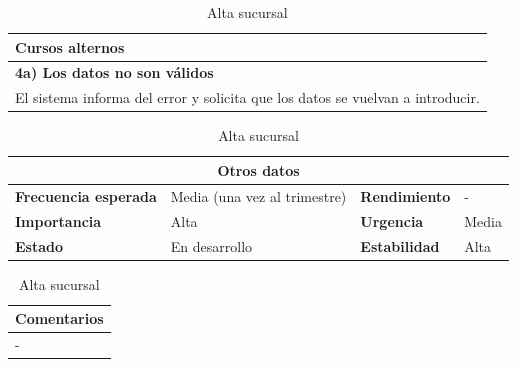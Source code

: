 \documentclass[12pt,spanish]{article}
\begin{document}
\begin{table}[H]
\vspace{1cm}

\begin{tabular}{|m{10pt}|m{7.15cm}|m{10pt}|m{7.15cm}|}
\hline
\multicolumn{4}{|m{16.2cm}|}{\textbf{Cursos alternos}} \\
\hline
\multicolumn{4}{|m{16.2cm}|}{\textbf{4a) Los datos no son válidos}} \\
\hline
\multicolumn{4}{|m{16.2cm}|}{El sistema informa del error y solicita que los datos se vuelvan a introducir.} \\
\hline
\end{tabular}

\vspace{1cm}

\begin{tabular}{|m{3.72cm}|m{3.72cm}|m{3.72cm}|m{3.72cm}|}
\hline
\multicolumn{4}{|c|}{\textbf{Otros datos}} \\
\hline
\textbf{Frecuencia esperada} & Media (una vez al trimestre) & \textbf{Rendimiento} & - \\
\hline
\textbf{Importancia} & Alta & \textbf{Urgencia} & Media \\
\hline
\textbf{Estado} & En desarrollo & \textbf{Estabilidad} & Alta \\
\hline
\end{tabular}

\vspace{1cm}

\begin{tabular}{|m{16.2cm}|}
\hline
\textbf{Comentarios} \\
\hline
- \\
\hline
\end{tabular}

\caption{Alta sucursal}

\end{table}


\end{document}
